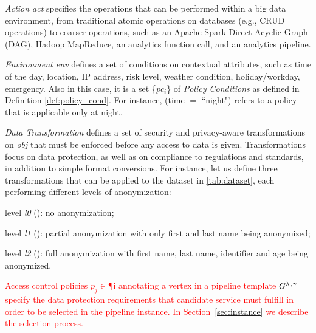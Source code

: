       \textit{Action act} specifies the operations that can be performed within a big data environment, from traditional atomic operations on databases (e.g., CRUD operations) to coarser operations, such as an Apache Spark Direct Acyclic Graph (DAG), Hadoop MapReduce, an analytics function call, and an analytics pipeline.

      \textit{Environment env} defines a set of conditions on contextual attributes, such as time of the day, location, IP address, risk level, weather condition, holiday/workday, emergency. Also in this case, it is a set \{$pc_i$\} of \emph{Policy Conditions} as defined in Definition \ref{def:policy_cond}. For instance, (time $=$  ``night") refers to a policy that is applicable only at night.

      \textit{Data Transformation \TP} defines a set of security and privacy-aware transformations on \textit{obj} that must be enforced before any access to data is given. Transformations focus on data protection, as well as on compliance to regulations and standards, in addition to simple format conversions. For instance, let us define three transformations that can be applied to the dataset in \cref{tab:dataset}, each performing different levels of anonymization:
      \begin{enumerate*}[label=\roman*)]
        \item level \emph{l0} (): no anonymization;
        \item level \emph{l1} (): partial anonymization with only first and last name being anonymized;
        \item level \emph{l2} (): full anonymization with first name, last name, identifier and age being anonymized.
      \end{enumerate*}



\textcolor{red}{Access control policies $p_j$$\in$\P{i} annotating a vertex  in a pipeline template $G^{\lambda\,,\gamma\,}$ specify the data protection requirements that candidate service must fulfill in order to be selected in the pipeline instance. In Section~\ref{sec:instance} we describe the selection process.}

